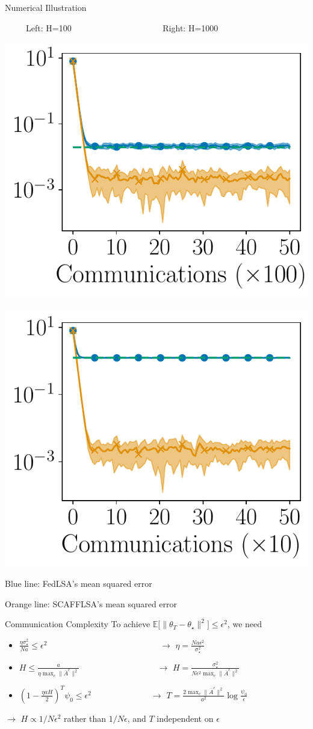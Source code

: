 \documentclass[aspectratio=169,14pt]{beamer}
\begin{document}
\begin{frame}{Numerical Illustration}
  \vspace{-0.5em}
  
  \begin{center}
    ~~~~~Left: H=100~~~~~~~~~~~~~~~~~~~~~
    Right: H=1000
 
    \vspace{-1em}
   
    \includegraphics[width=0.4\linewidth]{images/plot_hg_100_n100.pdf}
    ~~
    \includegraphics[width=0.4\linewidth]{images/plot_hg_1000_n100.pdf}
  \end{center}

  \vspace{-1em}

  Blue line: FedLSA's mean squared error

  \vspace{-1em}

  Orange line: SCAFFLSA's mean squared error
\end{frame}



\begin{frame}{Communication Complexity}
  To achieve $\mathbb{E} \Big[ \| {\theta_T - \theta_\star} \|^2 \Big] \le \epsilon^2$, we need
  \begin{itemize}
  \item $\frac{\eta \sigma_\star^2}{N a} \le \epsilon^2$ ~~~~~~\,~~~~~~~~~~~~~~~~~~~ $\rightarrow$ $\eta = \frac{N a \epsilon^2}{\sigma_\star^2}$
  \item $H \le \frac{a}{\eta \max_c \| \bar{A}^c \|^2}$ ~~~~~~~~~~~~~~~~~ $\rightarrow$ $H = \frac{ \sigma_\star^2 }{N \epsilon^2 \max_c \| \bar{A}^c \|^2}$
  \item $(1 - \frac{\eta a H}{2})^{T} \psi_0 \le \epsilon^2$ ~~~~~~~~~~~\,~~$\rightarrow$ $T = \frac{2 \max_c \| \bar{A}^c \|^2}{a^2} \log \tfrac{\psi_0}{ \epsilon }$
  \end{itemize}

  $\rightarrow$ $H \propto 1/N\epsilon^2$ rather than $1/N\epsilon$, and $T$ independent on $\epsilon$


\end{frame}
\end{document}
